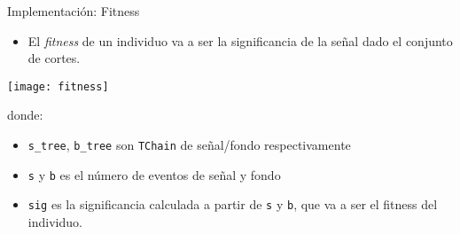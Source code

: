 \documentclass[center,10pt,cm]{beamer}
\begin{document}
\begin{frame}[fragile]{Implementaci\'on: Fitness}

  \begin{itemize}\itemsep0.2cm
  \item El \emph{fitness} de un individuo va a ser la significancia de la se\~nal dado el conjunto de cortes.
  \end{itemize}

  \texttt{[image: fitness]}

  \begin{flushleft}
    donde:
  \end{flushleft}

  \begin{itemize}\itemsep0.2cm
  \item \verb|s_tree|, \verb|b_tree| son \verb|TChain| de se\~nal/fondo respectivamente
  \item \texttt{s} y \texttt{b} es el n\'umero de eventos de se\~nal y fondo
  \item \texttt{sig} es la significancia calculada a partir de \texttt{s} y \texttt{b}, que va a ser el fitness del individuo.
  \end{itemize}

\end{frame}




\end{document}
